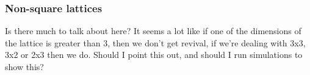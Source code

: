 \documentclass[a4paper, 10pt]{article}
\theoremstyle{plain}
\begin{document}
\subsubsection{Non-square lattices}
Is there much to talk about here? It seems a lot like if one of the dimensions
of the lattice is greater than 3, then we don't get revival, if we're dealing 
with 3x3, 3x2 or 2x3 then we do. Should I point this out, and should I run 
simulations to show this?


\newpage




\end{document}

